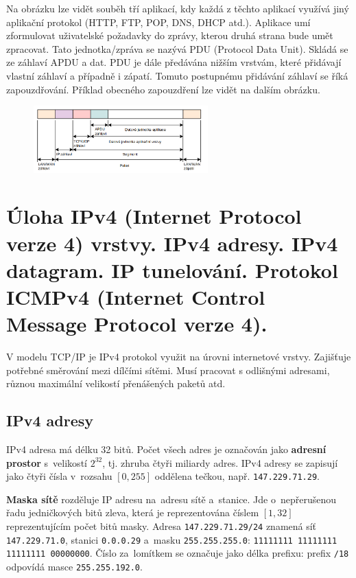 Na obrázku lze vidět souběh tří aplikací, kdy každá z těchto aplikací využívá jiný aplikační protokol (HTTP, FTP, POP, DNS, DHCP atd.).
Aplikace umí zformulovat uživatelské požadavky do zprávy, kterou druhá strana bude umět zpracovat.
Tato jednotka/zpráva se nazývá PDU (Protocol Data Unit).
Skládá se ze záhlaví APDU a dat.
PDU je dále předávána nižším vrstvám, které přidávají vlastní záhlaví a případně i zápatí.
Tomuto postupnému přidávání záhlaví se říká zapouzdřování.
Příklad obecného zapouzdření lze vidět na dalším obrázku.

\begin{figure}[!h]
    \centering
    \includegraphics[width=0.6\textwidth]{obrazky/013.png}
\end{figure}


\clearpage
\section{Úloha IPv4 (Internet Protocol verze 4) vrstvy. IPv4 adresy. IPv4 datagram. IP tunelování. Protokol ICMPv4 (Internet Control Message Protocol verze 4).}

V modelu TCP/IP je IPv4 protokol využit na úrovni internetové vrstvy.
Zajišťuje potřebné směrování mezi dílčími sítěmi.
Musí pracovat s odlišnými adresami, různou maximální velikostí přenášených paketů atd.

\subsection{IPv4 adresy}

IPv4 adresa má délku 32 bitů.
Počet všech adres je označován jako \textbf{adresní prostor} s~velikostí $2^{32}$, tj. zhruba čtyři miliardy adres.
IPv4 adresy se zapisují jako čtyři čísla v~rozsahu $[0, 255]$ oddělena tečkou, např. \texttt{147.229.71.29}.

\textbf{Maska sítě} rozděluje IP adresu na~adresu sítě a~stanice.
Jde o~nepřerušenou řadu jedničkových bitů zleva, která je reprezentována číslem $[1, 32]$ reprezentujícím počet bitů masky.
Adresa \texttt{147.229.71.29/24} znamená síť \texttt{147.229.71.0}, stanici \texttt{0.0.0.29} a~masku \texttt{255.255.255.0}: \texttt{11111111 11111111 11111111 00000000}.
Číslo za~lomítkem se označuje jako délka prefixu: prefix \texttt{/18} odpovídá masce \texttt{255.255.192.0}.

